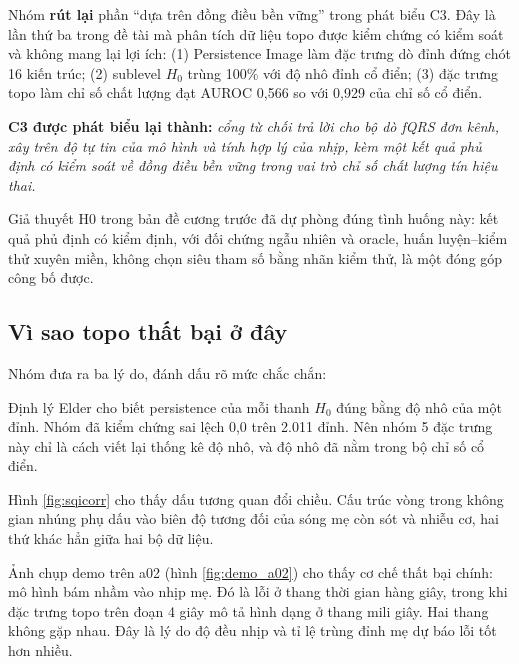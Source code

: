 \begin{canhbao}[title={Điều này làm gì với đóng góp C3}]
Nhóm \textbf{rút lại} phần ``dựa trên đồng điều bền vững'' trong phát biểu C3. Đây là lần thứ ba trong đề
tài mà phân tích dữ liệu topo được kiểm chứng có kiểm soát và không mang lại lợi ích: (1) Persistence
Image làm đặc trưng dò đỉnh đứng chót 16 kiến trúc; (2) sublevel $H_0$ trùng 100\% với độ nhô đỉnh cổ
điển; (3) đặc trưng topo làm chỉ số chất lượng đạt AUROC 0,566 so với 0,929 của chỉ số cổ điển.

\textbf{C3 được phát biểu lại thành:} \textit{cổng từ chối trả lời cho bộ dò fQRS đơn kênh, xây trên độ
tự tin của mô hình và tính hợp lý của nhịp, kèm một kết quả phủ định có kiểm soát về đồng điều bền vững
trong vai trò chỉ số chất lượng tín hiệu thai.}

Giả thuyết H0 trong bản đề cương trước đã dự phòng đúng tình huống này: kết quả phủ định có kiểm định,
với đối chứng ngẫu nhiên và oracle, huấn luyện--kiểm thử xuyên miền, không chọn siêu tham số bằng nhãn
kiểm thử, là một đóng góp công bố được.
\end{canhbao}

\subsection{Vì sao topo thất bại ở đây}

Nhóm đưa ra ba lý do, đánh dấu rõ mức chắc chắn:

\begin{description}[leftmargin=2.0em,style=nextline,itemsep=4pt]
\item[Đã chứng minh --- sublevel $H_0$ không phải đặc trưng mới.] Định lý Elder cho biết persistence của
mỗi thanh $H_0$ đúng bằng độ nhô của một đỉnh. Nhóm đã kiểm chứng sai lệch 0,0 trên 2.011 đỉnh. Nên
nhóm 5 đặc trưng này chỉ là cách viết lại thống kê độ nhô, và độ nhô đã nằm trong bộ chỉ số cổ điển.

\item[Đã đo --- đặc trưng $H_1$ của nhúng trễ không ổn định giữa bộ dữ liệu.] Hình \ref{fig:sqicorr} cho
thấy dấu tương quan đổi chiều. Cấu trúc vòng trong không gian nhúng phụ dấu vào biên độ tương đối của
sóng mẹ còn sót và nhiễu cơ, hai thứ khác hẳn giữa hai bộ dữ liệu.

\item[Suy luận --- lỗi mô hình là lỗi \textit{nhịp}, không phải lỗi \textit{hình dạng}.] Ảnh chụp demo
trên a02 (hình \ref{fig:demo_a02}) cho thấy cơ chế thất bại chính: mô hình bám nhầm vào nhịp mẹ. Đó là
lỗi ở thang thời gian hàng giây, trong khi đặc trưng topo trên đoạn 4 giây mô tả hình dạng ở thang mili
giây. Hai thang không gặp nhau. Đây là lý do độ đều nhịp và tỉ lệ trùng đỉnh mẹ dự báo lỗi tốt hơn nhiều.
\end{description}

